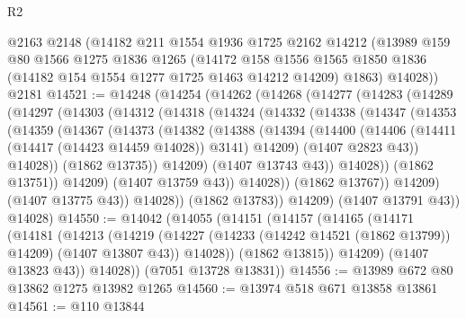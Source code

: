 \begin{lexlean}{R2}
\begin{coremodule}
    @2163
    @2148
    (@14182
      @211
      @1554
      @1936
      @1725
      @2162
      @14212
      (@13989
        @159
        @80
        @1566
        @1275
        @1836
        @1265
        (@14172
          @158
          @1556
          @1565
          @1850
          @1836
          (@14182 @154 @1554 @1277 @1725 @1463 @14212 @14209)
          @1863)
        @14028))
    @2181
@14521 := @14248
    (@14254
      (@14262
        (@14268
          (@14277
            (@14283
              (@14289
                (@14297
                  (@14303
                    (@14312
                      (@14318
                        (@14324
                          (@14332
                            (@14338
                              (@14347
                                (@14353
                                  (@14359
                                    (@14367
                                      (@14373
                                        (@14382
                                          (@14388
                                            (@14394
                                              (@14400
                                                (@14406
                                                  (@14411 (@14417 (@14423 @14459 @14028)) @3141)
                                                  @14209)
                                                (@1407 @2823 @43))
                                              @14028))
                                          (@1862 @13735))
                                        @14209)
                                      (@1407 @13743 @43))
                                    @14028))
                                (@1862 @13751))
                              @14209)
                            (@1407 @13759 @43))
                          @14028))
                      (@1862 @13767))
                    @14209)
                  (@1407 @13775 @43))
                @14028))
            (@1862 @13783))
          @14209)
        (@1407 @13791 @43))
      @14028)
@14550 := @14042
    (@14055
      (@14151
        (@14157
          (@14165
            (@14171
              (@14181
                (@14213
                  (@14219
                    (@14227 (@14233 (@14242 @14521 (@1862 @13799)) @14209) (@1407 @13807 @43))
                    @14028))
                (@1862 @13815))
              @14209)
            (@1407 @13823 @43))
          @14028))
      (@7051 @13728 @13831))
@14556 := @13989 @672 @80 @13862 @1275 @13982 @1265
@14560 := @13974 @518 @671 @13858 @13861
@14561 := @110 @13844

\end{coremodule}
\end{lexlean}
